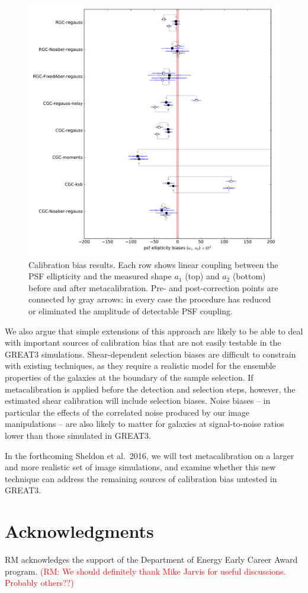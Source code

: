 \documentclass[iop]{emulateapj}
\newcommand\rmcomment[1]{\textcolor{red}{(RM: #1)}}
\begin{document}
\begin{figure}[t]
\begin{center}
\includegraphics[width=0.8\linewidth]{./Plots/a_results_linear.pdf}
\end{center}
\caption{Calibration bias results. Each row shows linear coupling
  between the PSF ellipticity and the measured shape $a_1$ (top) and
  $a_2$ (bottom) before and after metacalibration. Pre- and
  post-correction points are connected by gray arrows: in every case
  the procedure has reduced or eliminated the amplitude of detectable
  PSF coupling.}
\end{figure}



We also argue that simple extensions of this approach are likely to be
able to deal with important sources of calibration bias that are not
easily testable in the GREAT3 simulations. Shear-dependent selection
biases are difficult to constrain with existing techniques, as they
require a realistic model for the ensemble properties of the galaxies
at the boundary of the sample selection. If metacalibration is applied
before the detection and selection steps, however, the estimated shear
calibration will include selection biases. Noise biases -- in
particular the effects of the correlated noise produced by our image
manipulations -- are also likely to matter for galaxies at
signal-to-noise ratios lower than those simulated in GREAT3.

In the forthcoming Sheldon et al.\ 2016, we will test metacalibration
on a larger and more realistic set of image simulations, and examine
whether this new technique can address the remaining sources of
calibration bias untested in GREAT3.




\section*{Acknowledgments}

RM acknowledges the support of the
Department of Energy Early Career Award program.
\rmcomment{We should definitely thank Mike Jarvis for useful discussions.  Probably others??}



\end{document}
